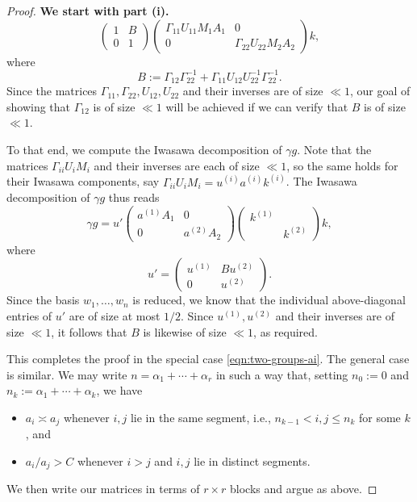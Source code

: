 \documentclass[reqno]{amsart} 
\begin{document}
\begin{proof} {\bf We start with part (i).}
\begin{equation*}
    \begin{pmatrix}
      1 & B \\
      0 & 1
    \end{pmatrix}
    \begin{pmatrix}
      \Gamma_{1 1} U_{1 1} M_1 A_1 & 0 \\
      0 & \Gamma_{2 2} U_{2 2} M_2 A_2
    \end{pmatrix}
    k,
  \end{equation*}
  where
  \begin{equation*}
    B := \Gamma_{1 2} \Gamma_{2 2}^{-1} + \Gamma_{1 1} U_{12} U_{22}^{-1} \Gamma_{22}^{-1}.
  \end{equation*}
  Since the matrices $\Gamma_{11}, \Gamma_{22}, U_{12}, U_{22}$ and their inverses are of size $\ll 1$, our goal of showing that $\Gamma_{12}$ is of size $\ll 1$ will be achieved if we can verify that $B$ is of size $\ll 1$.

  To that end, we compute the Iwasawa decomposition of $\gamma g$.  Note that the matrices $\Gamma_{i i} U_i M_i$ and their inverses are each of size $\ll 1$, so the same holds for their Iwasawa components, say $\Gamma_{i i} U_i M_i = u^{(i)} a^{(i)} k^{(i)}$.  The Iwasawa decomposition of $\gamma g$ thus reads
  \begin{equation*}
    \gamma g = u'
    \begin{pmatrix}
      a^{(1)} A_1 & 0 \\
      0 & a^{(2)} A_2
    \end{pmatrix}
    \begin{pmatrix}
      k^{(1)} &  \\
              & k^{(2)}
    \end{pmatrix}
    k,
  \end{equation*}
  where
  \begin{equation*}
    u' =
    \begin{pmatrix}
      u^{(1)} & B u^{(2)}
      \\
      0 & u^{(2)}
    \end{pmatrix}
    .
  \end{equation*}
  Since the basis $w_1,\dotsc,w_n$ is reduced, we know that the individual above-diagonal entries of $u'$ are of size at most $1/2$.  Since $u^{(1)}, u^{(2)}$ and their inverses are of size $\ll 1$, it follows that $B$ is likewise of size $\ll 1$, as required.

  This completes the proof in the special case \eqref{eqn:two-groups-ai}.  The general case is similar.  We may write $n = \alpha_1 + \dotsb + \alpha_r$ in such a way that, setting $n_0 := 0$ and $n_k := \alpha_1 + \dotsb + \alpha_k$, we have
  \begin{itemize}
  \item $a_i \asymp a_j$ whenever $i,j$ lie in the same segment, i.e., $n_{k-1} < i, j \leq n_k$ for some $k$, and
  \item $a_i / a_j > C$ whenever $i > j$ and $i,j$ lie in distinct segments.
  \end{itemize}
  We then write our matrices in terms of $r \times r$ blocks and argue as above.
\end{proof}
\end{document}
